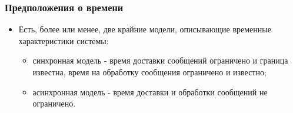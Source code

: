 \begin{frame}
\frametitle{Предположения о времени}
\begin{itemize}
  \item Есть, более или менее, две крайние модели, описывающие временные
  характеристики системы:
  \begin{itemize}
    \item синхронная модель - время доставки сообщений ограничено и граница
    известна, время на обработку сообщения ограничено и известно;
    \item асинхронная модель - время доставки и обработки сообщений не
    ограничено.
  \end{itemize}
\end{itemize}
\end{frame}
